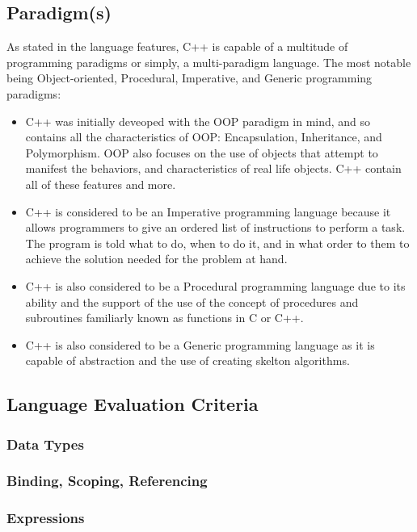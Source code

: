 \documentclass[12pt]{article}
\begin{document}
\subsection{Paradigm(s)}
As stated in the language features, C++ is capable of a multitude of programming paradigms or simply, a multi-paradigm language. The most notable being Object-oriented, Procedural, Imperative, and Generic programming paradigms: 
\begin{itemize}
  \item C++ was initially deveoped with the OOP paradigm in mind, and so contains all the characteristics of OOP: Encapsulation, Inheritance, and Polymorphism. OOP also focuses on the use of objects that attempt to manifest the behaviors, and characteristics of real life objects. C++ contain all of these features and more.
  \item C++ is considered to be an Imperative programming language because it allows programmers to give an ordered list of instructions to perform a task. The program is told what to do, when to do it, and in what order to them to achieve the solution needed for the problem at hand.
  \item C++ is also considered to be a Procedural programming language due to its ability and the support of the use of the concept of procedures and subroutines familiarly known as functions in C or C++.
  \item C++ is also considered to be a Generic programming language as it is capable of abstraction and the use of creating skelton algorithms. 
\end{itemize}

\subsection{Language Evaluation Criteria}

\subsubsection{Data Types}

\subsubsection{Binding, Scoping, Referencing}

\subsubsection{Expressions}
\end{document}
